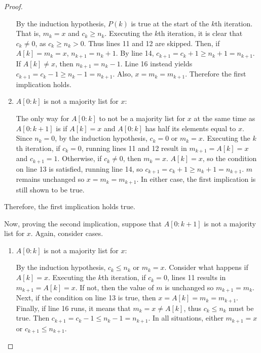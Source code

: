 \documentclass[11pt]{article}
\begin{document}
\begin{proof}
\begin{enumerate}
            By the induction hypothesis, \(P(k)\) is true at the start of the \(k\)th iteration. That is, \(m_k = x\) and \(c_k \geq n_k\). Executing the \(k\)th iteration, it is clear that \(c_k \neq 0\), as \(c_k \geq n_k > 0\). Thus lines 11 and 12 are skipped. Then, if \(A[k]=m_k = x\), \(n_{k+1} = n_k + 1\). By line 14, \(c_{k+1} = c_k + 1 \geq n_k + 1 = n_{k+1}\). If \(A[k]\neq x\), then \(n_{k+1} = n_k - 1\). Line 16 instead yields \(c_{k+1} = c_k - 1 \geq n_k - 1 = n_{k+1}\).  Also, \(x=m_k=m_{k+1}\). Therefore the first implication holds.

            \item \(A[0:k]\) is not a majority list for \(x\):
            
            The only way for \(A[0:k]\) to not be a majority list for \(x\) at the same time as \(A[0:k+1]\) is if \(A[k]=x\) and \(A[0:k]\) has half its elements equal to \(x\). Since \(n_k=0\), by the induction hypothesis, \(c_k = 0\) or \(m_k=x\). Executing the \(k\)th iteration, if \(c_k=0\), running lines 11 and 12 result in \(m_{k+1} = A[k] = x\) and \(c_{k+1} = 1\). Otherwise, if \(c_k \neq 0\), then \(m_k=x\). \(A[k]=x\), so the condition on line 13 is satisfied, running line 14, so \(c_{k+1} = c_k + 1 \geq n_k + 1 = n_{k+1}\). \(m\) remains unchanged so \(x=m_k=m_{k+1}\). In either case, the first implication is still shown to be true.
        \end{enumerate}
        Therefore, the first implication holds true.

        Now, proving the second implication, suppose that \(A[0:k+1]\) is not a majority list for \(x\). Again, consider cases.
        \begin{enumerate}
            \item \(A[0:k]\) is not a majority list for \(x\):
            
            By the induction hypothesis, \(c_k \leq n_k\) or \(m_k = x\). Consider what happens if \(A[k]= x\). Executing the \(k\)th iteration, if \(c_k=0\), lines 11 results in \(m_{k+1} = A[k]= x\). If not, then the value of \(m\) is unchanged so \(m_{k+1} = m_k\). Next, if the condition on line 13 is true, then \(x = A[k]= m_k= m_{k+1}\). Finally, if line 16 runs, it means that \(m_k = x \neq A[k]\), thus \(c_k \leq n_k\) must be true. Then \(c_{k+1} = c_k - 1 \leq n_k - 1 = n_{k+1}\). In all situations, either \(m_{k+1} = x\) or \(c_{k+1} \leq n_{k+1}\).


\end{enumerate}
\end{proof}
\end{document}
